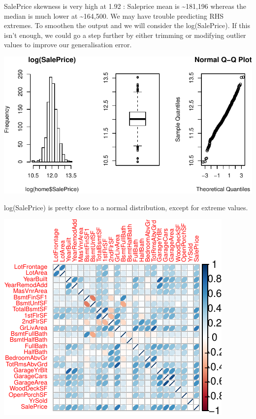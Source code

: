 \documentclass[]{article}
\begin{document}
SalePrice skewness is very high at 1.92 : Saleprice mean is
\textasciitilde{}181,196 whereas the median is much lower at
\textasciitilde{}164,500. We may have trouble predicting RHS extremes.
To smoothen the output and we will consider the log(SalePrice). If this
isn't enough, we could go a step further by either trimming or modifying
outlier values to improve our generalisation error.

\begin{center}\includegraphics{r_file_v5_files/figure-latex/unnamed-chunk-9-1} \end{center}

log(SalePrice) is pretty close to a normal distribution, except for
extreme values.

\begin{center}\includegraphics{r_file_v5_files/figure-latex/unnamed-chunk-10-1} \end{center}
\end{document}
